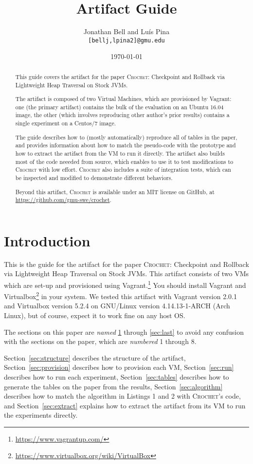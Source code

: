 \documentclass[12pt]{article}
\title{\emph{\papertitle} \\ Artifact Guide}
\author{Jonathan Bell and Lu\'{i}s Pina \\ \texttt{[bellj,lpina2]@gmu.edu}}
\affil{George Mason University}
\date{\today}
\newcommand{\sysname}{\textsc{Crochet}\xspace}
\newcommand{\papertitle}{\sysname: Checkpoint and Rollback via Lightweight Heap Traversal on Stock JVMs\xspace}
\begin{document}
\maketitle

\begin{abstract}

    This guide covers the artifact for the paper \papertitle.

    The artifact is composed of two Virtual Machines, which are provisioned by
    Vagrant: one (the primary artifact) contains the bulk of the evaluation on an Ubuntu 16.04 image,
    the other (which involves reproducing other author's prior results) contains a single experiment on a Centos/7 image.

    The guide describes how to (mostly automatically) reproduce all of tables in the paper,
    and provides information about how to match the pseudo-code with the
    prototype and how to extract the artifact from the VM to run it directly.
    The artifact also builds most of the code neeeded from source, which enables
    to use it to test modifications to \sysname with low effort. \sysname also includes a suite of integration tests, which can be inspected and modified to demonstrate different behaviors.

Beyond this artifact, \sysname is available under an MIT license on GitHub, at \url{https://github.com/gmu-swe/crochet}.
\end{abstract}

\section{Introduction}
\label{sec:first}

This is the guide for the artifact for the paper \papertitle.  This artifact consists
of two VMs which are set-up and provisioned using
Vagrant.\footnote{\url{https://www.vagrantup.com/}}  You should install Vagrant
and Virtualbox\footnote{\url{https://www.virtualbox.org/wiki/VirtualBox}} in
your system.  We tested this artifact with Vagrant version 2.0.1 and Virtualbox
version 5.2.4 on GNU/Linux version 4.14.13-1-ARCH (Arch Linux), but of course, expect it to work fine on any host OS.

The sections on this paper are \emph{named} \ref{sec:first} through
\ref{sec:last} to avoid any confusion with the sections on the paper, which are
\emph{numbered} 1 through 8.

Section~\ref{sec:structure} describes the structure of the artifact,
Section~\ref{sec:provision} describes how to provision each VM,
Section~\ref{sec:run} describes how to run each experiment,
Section~\ref{sec:tables} describes how to generate the tables on the paper from
the results, Section~\ref{sec:algorithm} describes how to match the algorithm in
Listings 1 and 2 with \sysname's code, and Section~\ref{sec:extract} explains how to
extract the artifact from its VM to run the experiments directly.
\end{document}

